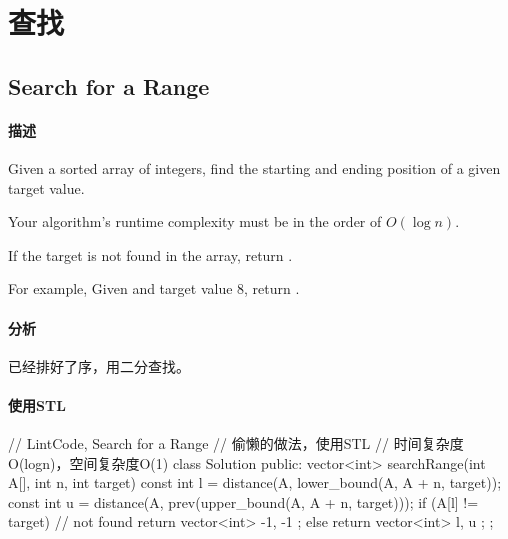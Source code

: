 \chapter{查找}


\section{Search for a Range} %
\label{sec:search-for-a-range}


\subsubsection{描述}
Given a sorted array of integers, find the starting and ending position of a given target value.

Your algorithm's runtime complexity must be in the order of $O(\log n)$.

If the target is not found in the array, return \code{[-1, -1]}.

For example,
Given \code{[5, 7, 7, 8, 8, 10]} and target value 8,
return \code{[3, 4]}.


\subsubsection{分析}
已经排好了序，用二分查找。


\subsubsection{使用STL}
\begin{Code}
// LintCode, Search for a Range
// 偷懒的做法，使用STL
// 时间复杂度O(logn)，空间复杂度O(1)
class Solution {
public:
    vector<int> searchRange(int A[], int n, int target) {
        const int l = distance(A, lower_bound(A, A + n, target));
        const int u = distance(A, prev(upper_bound(A, A + n, target)));
        if (A[l] != target) // not found
            return vector<int> { -1, -1 };
        else
            return vector<int> { l, u };
    }
};
\end{Code}


